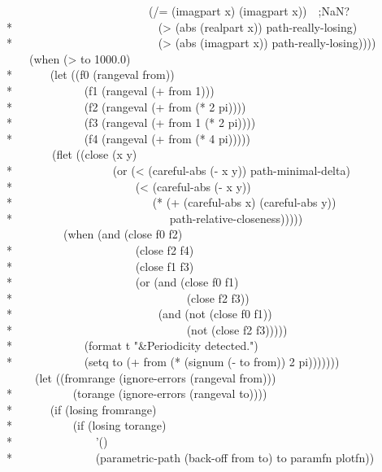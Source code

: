 \begin{new}
\begin{lisp}
~~~~~~~~~~~~~~~~~~~~~~~~~(/= (imagpart x) (imagpart x))~~;NaN? \\*
~~~~~~~~~~~~~~~~~~~~~~~~~(> (abs (realpart x)) path-really-losing) \\*
~~~~~~~~~~~~~~~~~~~~~~~~~(> (abs (imagpart x)) path-really-losing)))) \\
~~~~(when (> to 1000.0) \\*
~~~~~~(let ((f0 (rangeval from)) \\*
~~~~~~~~~~~~(f1 (rangeval (+ from 1))) \\*
~~~~~~~~~~~~(f2 (rangeval (+ from (* 2 pi)))) \\*
~~~~~~~~~~~~(f3 (rangeval (+ from 1 (* 2 pi)))) \\*
~~~~~~~~~~~~(f4 (rangeval (+ from (* 4 pi))))) \\
~~~~~~~~(flet ((close (x y) \\*
~~~~~~~~~~~~~~~~~(or (< (careful-abs (- x y)) path-minimal-delta) \\*
~~~~~~~~~~~~~~~~~~~~~(< (careful-abs (- x y)) \\*
~~~~~~~~~~~~~~~~~~~~~~~~(* (+ (careful-abs x) (careful-abs y)) \\*
~~~~~~~~~~~~~~~~~~~~~~~~~~~path-relative-closeness))))) \\
~~~~~~~~~~(when (and (close f0 f2) \\*
~~~~~~~~~~~~~~~~~~~~~(close f2 f4) \\*
~~~~~~~~~~~~~~~~~~~~~(close f1 f3) \\*
~~~~~~~~~~~~~~~~~~~~~(or (and (close f0 f1) \\*
~~~~~~~~~~~~~~~~~~~~~~~~~~~~~~(close f2 f3)) \\*
~~~~~~~~~~~~~~~~~~~~~~~~~(and (not (close f0 f1)) \\*
~~~~~~~~~~~~~~~~~~~~~~~~~~~~~~(not (close f2 f3))))) \\*
~~~~~~~~~~~~(format t "{\Xtilde}\&Periodicity detected.") \\*
~~~~~~~~~~~~(setq to (+ from (* (signum (- to from)) 2 pi))))))) \\
~~~~~(let ((fromrange (ignore-errors (rangeval from))) \\*
~~~~~~~~~~(torange (ignore-errors (rangeval to)))) \\*
~~~~~~(if (losing fromrange) \\*
~~~~~~~~~~(if (losing torange) \\*
~~~~~~~~~~~~~~'() \\*
~~~~~~~~~~~~~~(parametric-path (back-off from to) to paramfn plotfn)) \\

\end{lisp}
\end{new}
